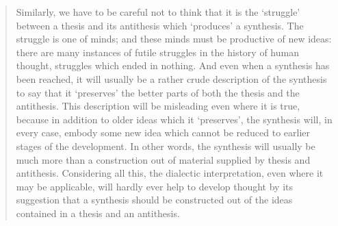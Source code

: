 \documentclass[11pt, oneside]{article}   	%
\begin{document}














\begin{quote}
    Similarly, we have to be careful not to think that it is the ‘struggle’ between a thesis and its antithesis which ‘produces’ a synthesis. The struggle is one of minds; and these minds must be productive of new ideas: there are many instances of futile struggles in the history of human thought, struggles which ended in nothing. And even when a synthesis has been reached, it will usually be a rather crude description of the synthesis to say that it ‘preserves’ the better parts of both the thesis and the antithesis. This description will be misleading even where it is true, because in addition to older ideas which it ‘preserves’, the synthesis will, in every case, embody some new idea which cannot be reduced to earlier stages of the development. In other words, the synthesis will usually be much more than a construction out of material supplied by thesis and antithesis. Considering all this, the dialectic interpretation, even where it may be applicable, will hardly ever help to develop thought by its suggestion that a synthesis should be constructed out of the ideas contained in a thesis and an antithesis. 
    \citep{PopperCR1963}
\end{quote}
\end{document}
